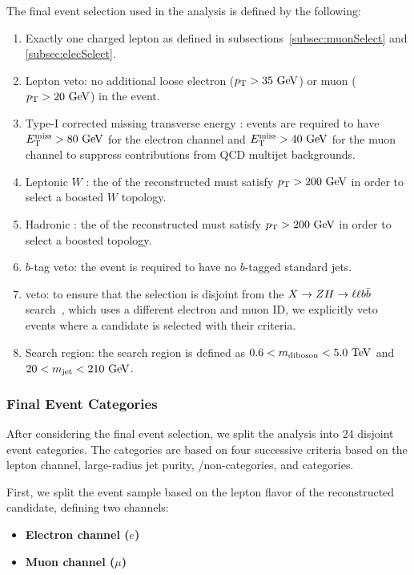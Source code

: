 The final event selection used in the analysis is defined by the following:
\begin{enumerate}
  \item Exactly one charged lepton as defined in subsections~\ref{subsec:muonSelect} and \ref{subsec:elecSelect}.
  \item Lepton veto: no additional loose electron ($\pt>35\unit{GeV}$) or muon ($\pt>20\unit{GeV}$) in the event.
  \item Type-I corrected missing transverse energy \EtmissTI: events are required to have $\Etmiss>80\unit{GeV}$ for the electron channel and $\Etmiss>40\unit{GeV}$ for the muon channel to suppress contributions from QCD multijet backgrounds.
  \item Leptonic $W$ \pt: the \pt of the reconstructed \Wlep must satisfy $\pt>200\unit{GeV}$ in order to select a boosted $W$ topology.
  \item Hadronic \VorH \pt: the \pt of the reconstructed \Vhad must satisfy $\pt>200\unit{GeV}$ in order to select a boosted \VorH topology.
  \item $b$-tag veto: the event is required to have no $b$-tagged standard jets.
  \item \ZH veto: to ensure that the selection is disjoint from the $X\to\ZH\to\ell\ell\bbbar$ search~\cite{CMS_AN2019_107}, which uses a different electron and muon ID, we explicitly veto events where a \ZH candidate is selected with their criteria.
  \item Search region: the search region is defined as $0.6<\MVV<5.0\unit{TeV}$ and $20<\MJ<210\unit{GeV}$.
\end{enumerate}

\subsubsection{Final Event Categories}

After considering the final event selection, we split the analysis into 24 disjoint event categories.
The categories are based on four successive criteria based on the lepton channel, large-radius jet purity, \VBF/non-\VBF categories, and \Dy categories.

First, we split the event sample based on the lepton flavor of the reconstructed \Wlep candidate, defining two channels:
\begin{itemize}
  \item {\bfseries Electron channel ($e$)}
  \item {\bfseries Muon channel ($\mu$)}
\end{itemize}


